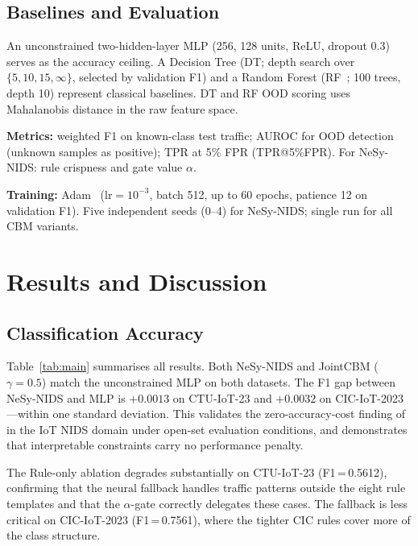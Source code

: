 \documentclass[journal]{IEEEtran}
\begin{document}
\subsection{Baselines and Evaluation}

An unconstrained two-hidden-layer MLP (256, 128 units, ReLU, dropout
0.3) serves as the accuracy ceiling. A Decision Tree (DT; depth search
over $\{5,10,15,\infty\}$, selected by validation F1) and a Random
Forest (RF~\cite{breiman2001random}; 100 trees, depth 10) represent
classical baselines. DT and RF OOD scoring uses Mahalanobis distance
in the raw feature space.

\textbf{Metrics:} weighted F1 on known-class test traffic; AUROC for
OOD detection (unknown samples as positive); TPR at 5\% FPR
(TPR@5\%FPR). For NeSy-NIDS: rule crispness and gate value $\alpha$.

\textbf{Training:} Adam~\cite{kingma2014adam} ($\mathrm{lr}{=}10^{-3}$,
batch 512, up to 60 epochs, patience 12 on validation F1). Five
independent seeds (0--4) for NeSy-NIDS; single run for all CBM
variants.

\section{Results and Discussion}

\subsection{Classification Accuracy}

\begin{sloppypar}
Table~\ref{tab:main} summarises all results. Both NeSy-NIDS and
JointCBM ($\gamma{=}0.5$) match the unconstrained MLP on both datasets.
The F1 gap between NeSy-NIDS and MLP is $+0.0013$ on CTU-IoT-23 and
$+0.0032$ on CIC-IoT-2023---within one standard deviation. This
validates the zero-accuracy-cost finding of~\cite{koh2020concept}
in the IoT NIDS domain under open-set evaluation conditions, and
demonstrates that interpretable constraints carry no performance
penalty.
\end{sloppypar}

The Rule-only ablation degrades substantially on CTU-IoT-23
(F1\,=\,0.5612), confirming that the neural fallback handles traffic
patterns outside the eight rule templates and that the $\alpha$-gate
correctly delegates these cases. The fallback is less critical on
CIC-IoT-2023 (F1\,=\,0.7561), where the tighter CIC rules cover more
of the class structure.
\end{document}

